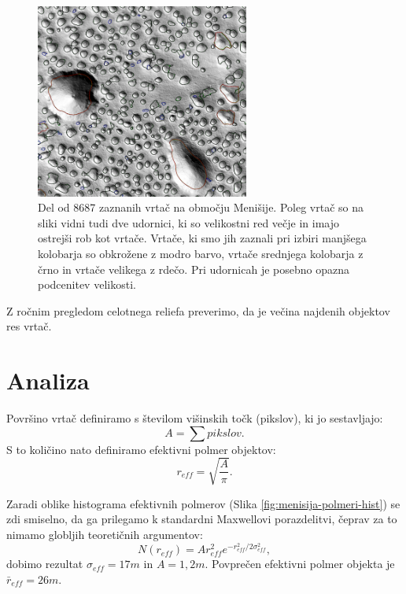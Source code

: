 \documentclass[a4paper, twoside, 12pt]{book}
\begin{document}
  \begin{figure}[h]
    \begin{center}
      \includegraphics[width=7cm]{slike/menisija-vrtace}
    \end{center}
    \caption{Del od 8687 zaznanih vrtač na območju Menišije. Poleg vrtač so na sliki vidni tudi dve udornici, ki so velikostni red večje in imajo ostrejši rob kot vrtače. Vrtače, ki smo jih zaznali pri izbiri manjšega kolobarja so obkrožene z modro barvo, vrtače srednjega kolobarja z črno in vrtače velikega z rdečo. Pri udornicah je posebno opazna podcenitev velikosti.}
    \label{fig:menisija-vrtace}
  \end{figure}

Z ročnim pregledom celotnega reliefa preverimo, da je večina najdenih objektov res vrtač.

  \section{Analiza}

  Površino vrtač definiramo s številom višinskih točk (pikslov), ki jo sestavljajo:
    \begin{equation}
      A = \sum pikslov.
    \end{equation}
S to količino nato definiramo efektivni polmer objektov:
    \begin{equation} 
      r_{eff} = \sqrt{\frac{A}{\pi}}. 
    \end{equation}

Zaradi oblike histograma efektivnih polmerov (Slika \ref{fig:menisija-polmeri-hist}) se zdi smiselno, da ga prilegamo k standardni Maxwellovi porazdelitvi, čeprav za to nimamo globljih teoretičnih argumentov:
\begin{equation} 
  N(r_{eff}) = A r_{eff}^2 e^{-r_{eff}^2/ 2 \sigma_{eff}^2},
\end{equation}
dobimo rezultat $\sigma_{eff}=17m$ in $A=1,2m$. Povprečen efektivni polmer objekta je $\bar r_{eff}=26m$.
\end{document}
